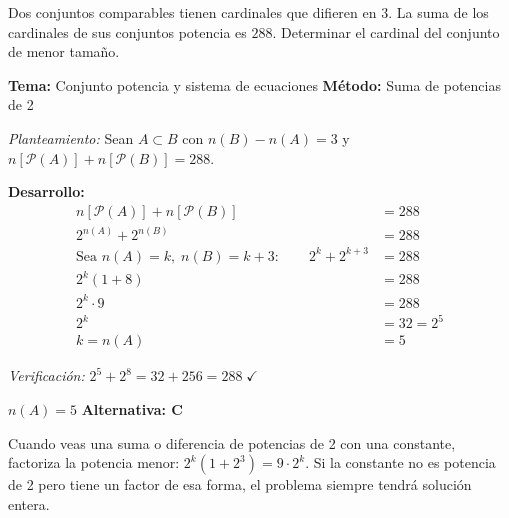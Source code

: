 \begin{tcolorbox}[
  enhanced, breakable,
  colback=GrisClaro, colframe=AzulPizarra,
  fonttitle=\bfseries\sffamily,
  title={Ejercicio 13 --- Nivel Avanzado},
  arc=3pt, boxrule=0.8pt
]
\begin{problema}
  Dos conjuntos comparables tienen cardinales que difieren en $3$.
  La suma de los cardinales de sus conjuntos potencia es $288$.
  Determinar el cardinal del conjunto de menor tama\~no.
\end{problema}

\smallskip
\noindent
\textbf{\sffamily\color{AzulMedio}Tema:} Conjunto potencia y sistema de ecuaciones
\hfill
\textbf{\sffamily\color{AzulMedio}M\'etodo:} Suma de potencias de 2

\medskip
\noindent\textit{Planteamiento:} Sean $A \subset B$ con
$n(B) - n(A) = 3$ y $n[\mathcal{P}(A)] + n[\mathcal{P}(B)] = 288$.

\medskip
\noindent\textbf{\sffamily Desarrollo:}
\begin{align*}
  n[\mathcal{P}(A)] + n[\mathcal{P}(B)] &= 288 \\
  2^{n(A)} + 2^{n(B)} &= 288 \\
  \text{Sea } n(A) = k,\; n(B) = k+3: \qquad
  2^{k} + 2^{k+3} &= 288 \\
  2^{k}(1 + 8) &= 288 \\
  2^{k} \cdot 9 &= 288 \\
  2^{k} &= 32 = 2^{5} \\
  k = n(A) &= 5
\end{align*}

\noindent\textit{Verificaci\'on:}
$2^{5}+2^{8} = 32 + 256 = 288 \;\checkmark$

\begin{tcolorbox}[
  colback=AzulClaro!60, colframe=AzulPizarra,
  arc=2pt, boxrule=0.8pt, left=8pt, right=8pt
]
\centering
$\displaystyle \boxed{n(A) = 5}$ \quad
\textbf{Alternativa: C}
\end{tcolorbox}

\begin{cajatip}
  Cuando veas una suma o diferencia de potencias de 2 con una constante,
  factoriza la potencia menor:
  $2^{k}(1 + 2^{3}) = 9 \cdot 2^{k}$.
  Si la constante no es potencia de 2 pero tiene un factor de esa forma, el
  problema siempre tendr\'a soluci\'on entera.
\end{cajatip}
\end{tcolorbox}

